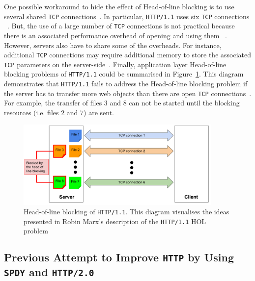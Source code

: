 \documentclass[12pt,a4paper,twoside,openright]{report}
\begin{document}
One possible workaround to hide the effect of Head-of-line blocking is to use several shared \texttt{TCP} connections~\cite{bib_digital_ocean_http11_vs_http2}.
In particular, \texttt{HTTP/1.1} uses six \texttt{TCP} connections ~\cite{bib_will-http2-make-my-site-faster, head-of-line-blocking-in-quic-and-http-3-the-details}.
But, the use of a large number of \texttt{TCP} connections is not practical because there is an associated performance overhead of opening and using them ~\cite{bib_digital_ocean_http11_vs_http2, head-of-line-blocking-in-quic-and-http-3-the-details}.
However, servers also have to share some of the overheads.
For instance, additional \texttt{TCP} connections may require additional memory to store the associated \texttt{TCP} parameters on the server-side~\cite{head-of-line-blocking-in-quic-and-http-3-the-details}.
Finally, application layer Head-of-line blocking problems of \texttt{HTTP/1.1} could be summarised in Figure~\ref{fig:Head_of_line_blocking_of_HTTP1_1}.
This diagram demonstrates that \texttt{HTTP/1.1} fails to address the Head-of-line blocking problem if the server has to transfer more web objects than there are open \texttt{TCP} connections~\cite{head-of-line-blocking-in-quic-and-http-3-the-details}.
For example, the transfer of files 3 and 8 can not be started until the blocking resources (i.e. files 2 and 7) are sent. 

    \begin{figure}[H]
    \centering
    \includegraphics[width=0.9\textwidth]{figs/Head_of_line_blocking_of_HTTP1_1.png}
    \caption[Head-of-line blocking of \texttt{HTTP/1.1}]{Head-of-line blocking of \texttt{HTTP/1.1}. This diagram visualises the ideas presented in Robin Marx's description of the \texttt{HTTP/1.1} HOL problem~\cite{head-of-line-blocking-in-quic-and-http-3-the-details}}
    \label{fig:Head_of_line_blocking_of_HTTP1_1}
    \end{figure}





\subsection{Previous Attempt to Improve \texttt{HTTP} by Using \texttt{SPDY} and \texttt{HTTP/2.0}} \label{Previous_attempt_to_improve_http_by_using_SPDY_and_HTTP2}
\end{document}
